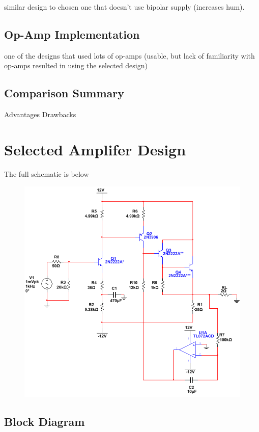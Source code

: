 \documentclass[journal]{IEEEtran}
\begin{document}
similar design to chosen one that doesn't use bipolar supply (increases hum). 

\subsection{Op-Amp Implementation}

one of the designs that used lots of op-amps (usable, but lack of familiarity with op-amps resulted in using the selected design)

\subsection{Comparison Summary}

Advantages Drawbacks 

\section{Selected Amplifer Design}

The full schematic is below

\begin{figure}[H]
\centering
\includegraphics[scale=.4]{final-schem.png}
\label{fig_amp_schem}
\end{figure}

\subsection{Block Diagram}
\end{document}
